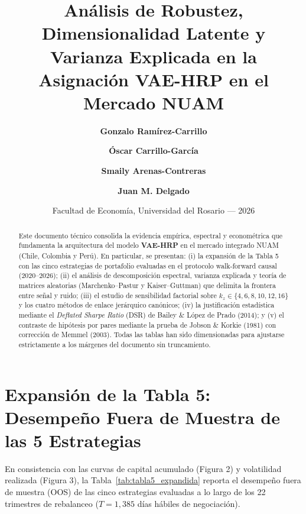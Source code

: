 \documentclass[11pt,a4paper]{article}
\title{\textbf{Análisis de Robustez, Dimensionalidad Latente y Varianza Explicada en la Asignación VAE-HRP en el Mercado NUAM}}
\author{\textbf{Gonzalo Ramírez-Carrillo} \and \textbf{Óscar Carrillo-García} \and \textbf{Smaily Arenas-Contreras} \and \textbf{Juan M. Delgado}}
\date{Facultad de Economía, Universidad del Rosario --- 2026}
\begin{document}
\maketitle

\begin{abstract}
Este documento técnico consolida la evidencia empírica, espectral y econométrica que fundamenta la arquitectura del modelo \textbf{VAE-HRP} en el mercado integrado NUAM (Chile, Colombia y Perú). En particular, se presentan: (i) la expansión de la Tabla 5 con las cinco estrategias de portafolio evaluadas en el protocolo walk-forward causal (2020--2026); (ii) el análisis de descomposición espectral, varianza explicada y teoría de matrices aleatorias (Marchenko--Pastur y Kaiser--Guttman) que delimita la frontera entre señal y ruido; (iii) el estudio de sensibilidad factorial sobre $k_z \in \{4, 6, 8, 10, 12, 16\}$ y los cuatro métodos de enlace jerárquico canónicos; (iv) la justificación estadística mediante el \textit{Deflated Sharpe Ratio} (DSR) de Bailey \& López de Prado (2014); y (v) el contraste de hipótesis por pares mediante la prueba de Jobson \& Korkie (1981) con corrección de Memmel (2003). Todas las tablas han sido dimensionadas para ajustarse estrictamente a los márgenes del documento sin truncamiento.
\end{abstract}

\section{Expansión de la Tabla 5: Desempeño Fuera de Muestra de las 5 Estrategias}

En consistencia con las curvas de capital acumulado (Figura 2) y volatilidad realizada (Figura 3), la Tabla~\ref{tab:tabla5_expandida} reporta el desempeño fuera de muestra (OOS) de las cinco estrategias evaluadas a lo largo de los 22 trimestres de rebalanceo ($T = 1{,}385$ días hábiles de negociación).
\end{document}
